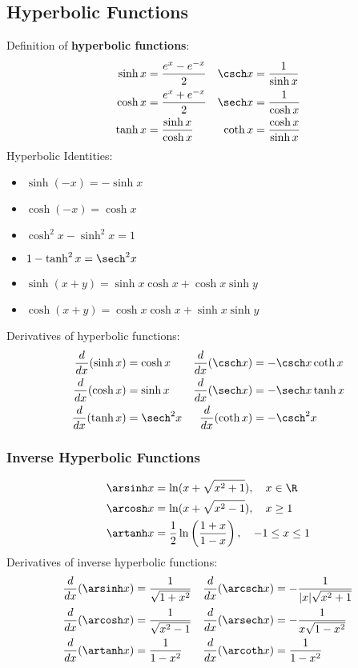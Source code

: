 \subsection{Hyperbolic Functions}

Definition of \textbf{hyperbolic functions}:
\begin{align*}
    \sinh x &= \frac{e^x-e^{-x}}{2} & \csch x &= \frac{1}{\sinh x} \\
    \cosh x &= \frac{e^x+e^{-x}}{2} & \sech x &= \frac{1}{\cosh x} \\
    \tanh x &= \frac{\sinh x}{\cosh x} & \coth x &= \frac{\cosh x}{\sinh x}
\end{align*}
Hyperbolic Identities:
\begin{itemize}
    \item \(\sinh(-x)=-\sinh x\)
    \item \(\cosh(-x)=\cosh x\)
    \item \(\cosh^2 x-\sinh^2 x=1\)
    \item \(1-\tanh^2 x=\sech^2 x\)
    \item \(\sinh(x+y)=\sinh x\cosh x+\cosh x\sinh y\)
    \item \(\cosh(x+y)=\cosh x\cosh x+\sinh x\sinh y\)
\end{itemize}
Derivatives of hyperbolic functions:
\begin{align*}
    \frac{d}{dx}(\sinh x) &= \cosh x
    & \frac{d}{dx}(\csch x) &= -\csch x\coth x \\
    \frac{d}{dx}(\cosh x) &= \sinh x
    & \frac{d}{dx}(\sech x) &= -\sech x\tanh x \\
    \frac{d}{dx}(\tanh x) &= \sech^2 x
    & \frac{d}{dx}(\coth x) &= -\csch^2 x
\end{align*}

\subsubsection*{Inverse Hyperbolic Functions}
\begin{align*}
    \arsinh x &= \ln(x+\sqrt{x^2+1}),\quad x\in\R \\
    \arcosh x &= \ln(x+\sqrt{x^2-1}),\quad x\geq 1 \\
    \artanh x &= \frac{1}{2}\ln\left(\frac{1+x}{1-x}\right),
    \quad -1\leq x\leq 1
\end{align*}
Derivatives of inverse hyperbolic functions:
\begin{align*}
    \frac{d}{dx}(\arsinh x) &= \frac{1}{\sqrt{1+x^2}}
    & \frac{d}{dx}(\arcsch x) &= -\frac{1}{|x|\sqrt{x^2+1}} \\
    \frac{d}{dx}(\arcosh x) &= \frac{1}{\sqrt{x^2-1}}
    & \frac{d}{dx}(\arsech x) &= -\frac{1}{x\sqrt{1-x^2}} \\
    \frac{d}{dx}(\artanh x) &= \frac{1}{1-x^2}
    & \frac{d}{dx}(\arcoth x) &= \frac{1}{1-x^2}
\end{align*}